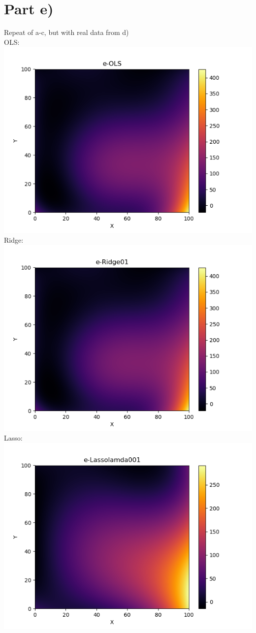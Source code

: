 \documentclass[a4paper,norsk]{article}
\begin{document}
\section*{Part e)}
Repeat of a-c, but with real data from d)
\\OLS:
\\ \includegraphics[scale=.7]{e-OLS}
\\Ridge:
\\ \includegraphics[scale=.7]{e-Ridge01}
\\Lasso:
\\ \includegraphics[scale=.7]{e-Lassolamda001}
\end{document}
